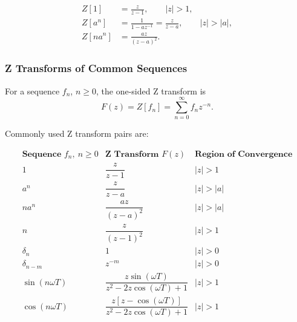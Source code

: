 \[
    \begin{aligned}
        Z[1]     & = \frac{z}{z-1}, \qquad |z|>1, \\
        Z[a^n]   & = \frac{1}{1-az^{-1}}
        = \frac{z}{z-a}, \qquad |z|>|a|,          \\
        Z[n a^n] & = \frac{az}{(z-a)^2}.
    \end{aligned}
\]

\subsubsection*{Z Transforms of Common Sequences}

\begin{conceptbox}
    For a sequence $f_n$, $n\geq 0$, the one-sided Z transform is
    \[
        F(z)=Z[f_n]=\sum_{n=0}^{\infty}f_nz^{-n}.
    \]

    Commonly used Z transform pairs are:

    \[
        \begin{array}{c|c|c}
            \textbf{Sequence } f_n,\ n\geq 0                    & \textbf{Z Transform } F(z) & \textbf{Region of Convergence} \\ \hline
            1                                                   & \dfrac{z}{z-1}             & |z|>1                          \\[8pt]
            a^n                                                 & \dfrac{z}{z-a}             & |z|>|a|                        \\[8pt]
            na^n                                                & \dfrac{az}{(z-a)^2}        & |z|>|a|                        \\[8pt]
            n                                                   & \dfrac{z}{(z-1)^2}         & |z|>1                          \\[8pt]
            \delta_n                                            &
            1                                                   & |z|>0                                                       \\[8pt]
            \delta_{n-m}                                        &
            z^{-m}                                              & |z|>0                                                       \\[8pt]
            \sin(n\omega T)                                     &
            \dfrac{z\sin(\omega T)}{z^2-2z\cos(\omega T)+1}     & |z|>1                                                       \\[12pt]
            \cos(n\omega T)                                     &
            \dfrac{z[z-\cos(\omega T)]}{z^2-2z\cos(\omega T)+1} & |z|>1
        \end{array}
    \]
\end{conceptbox}

